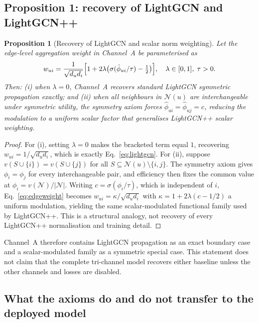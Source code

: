 \documentclass[a4paper,fleqn,longmktitle]{cas-dc}
\newtheorem{proposition}{Proposition}
\begin{document}
\subsection{Proposition 1: recovery of LightGCN and LightGCN++}
\label{sec:prop1}

\begin{proposition}[Recovery of LightGCN and scalar norm weighting]
\label{prop:recovery}
Let the edge-level aggregation weight in Channel~A be parameterised as
\begin{equation}
w_{ui} = \frac{1}{\sqrt{d_u d_i}}
\Bigl[1 + 2\lambda\bigl(\sigma(\hat{\phi}_{ui}/\tau)-\tfrac12\bigr)\Bigr],
\quad \lambda \in [0,1],\;\tau>0.
\label{eq:edgeweight}
\end{equation}
Then: (i) when $\lambda = 0$, Channel~A recovers standard LightGCN symmetric
propagation exactly; and (ii) when all neighbours in $\mathcal{N}(u)$ are
interchangeable under symmetric utility, the symmetry axiom forces
$\hat{\phi}_{ui} = \hat{\phi}_{uj} = c$, reducing the modulation to a uniform
scalar factor that generalises LightGCN++ scalar weighting.
\end{proposition}

\begin{proof}
For (i), setting $\lambda = 0$ makes the bracketed term equal $1$, recovering
$w_{ui} = 1/\sqrt{d_u d_i}$, which is exactly Eq.~\eqref{eq:lightgcn}. For
(ii), suppose $v(S \cup \{i\}) = v(S \cup \{j\})$ for all $S \subseteq
\mathcal{N}(u) \setminus \{i,j\}$. The symmetry axiom gives $\phi_i = \phi_j$
for every interchangeable pair, and efficiency then fixes the common value at
$\phi_i = v(\mathcal{N})/|\mathcal{N}|$. Writing $c = \sigma(\phi_i/\tau)$,
which is independent of $i$, Eq.~\eqref{eq:edgeweight} becomes $w_{ui} =
\kappa/\sqrt{d_u d_i}$ with $\kappa = 1+2\lambda(c-1/2)$ a uniform
modulation, yielding the same scalar-modulated functional family used by
LightGCN++. This is a structural analogy, not recovery of every LightGCN++
normalisation and training detail.
\end{proof}

Channel~A therefore contains LightGCN propagation as an exact boundary case
and a scalar-modulated family as a symmetric special case. This statement does
not claim that the complete tri-channel model recovers either baseline unless
the other channels and losses are disabled.

\subsection{What the axioms do and do not transfer to the deployed model}
\label{sec:gap}
\end{document}
